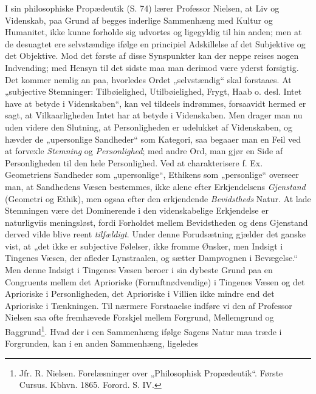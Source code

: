 \documentclass[12pt,a4paper]{book}
\newcommand{\opage}[1]{\marginnote{\footnotesize\textit{[#1]}}}
\begin{document}
I sin philosophiske Propædeutik (S. 74) lærer
Professor Nielsen, at Liv og Videnskab, paa Grund af
begges inderlige Sammenhæng med Kultur og Humanitet,
ikke kunne forholde sig udvortes og ligegyldig til hin%
\opage{21}\setcounter{footnote}{0}anden; men at de desuagtet ere selvstændige ifølge en
principiel Adskillelse af det Subjektive og det Objektive.
Mod det første af disse Synspunkter kan der neppe
reises nogen Indvending; med Hensyn til det sidste maa
man derimod være yderst forsigtig. Det kommer nemlig
an paa, hvorledes Ordet „selvstændig“ skal forstaaes.
At „subjective Stemninger: Tilbøielighed, Utilbøielighed,
Frygt, Haab o. desl. Intet have at betyde i Videnskaben“,
kan vel tildeels indrømmes, forsaavidt hermed
er sagt, at Vilkaarligheden Intet har at betyde i Videnskaben.
Men drager man nu uden videre den Slutning,
at Personligheden er udelukket af Videnskaben, og hævder
de „upersonlige Sandheder“ som Kategori, saa begaaer
man en Feil ved at forvexle \emph{Stemning} og \emph{Personlighed};
med andre Ord, man gjør en Side af Personligheden
til den hele Personlighed. Ved at charakterisere
f. Ex. Geometriens Sandheder som „upersonlige“, Ethikens
som „personlige“ overseer man, at Sandhedens
Væsen bestemmes, ikke alene efter Erkjendelsens \emph{Gjenstand}
(Geometri og Ethik), men ogsaa efter den erkjendende
\emph{Bevidstheds} Natur. At lade Stemningen være
det Dominerende i den videnskabelige Erkjendelse er naturligviis
meningsløst, fordi Forholdet mellem Bevidstheden
og dens Gjenstand derved vilde blive reent \emph{tilfældigt}.
Under denne Forudsætning gjælder det ganske vist, at „det
ikke er subjective Følelser, ikke fromme Ønsker, men
Indsigt i Tingenes Væsen, der afleder Lynstraalen, og
sætter Dampvognen i Bevægelse.“ Men denne Indsigt i
Tingenes Væsen beroer i sin dybeste Grund paa en
Congruents mellem det Aprioriske (Fornuftnødvendige) i
\opage{22}\setcounter{footnote}{0}%
Tingenes Væsen og det Aprioriske i Personligheden, det
Aprioriske i Villien ikke mindre end det Aprioriske i
Tænkningen. Til nærmere Forstaaelse indføre vi den af
Professor Nielsen saa ofte fremhævede Forskjel mellem
Forgrund, Mellemgrund og Baggrund\footnote{Jfr. R. Nielsen. Forelæsninger over „Philosophisk Propædeutik“.
Første Cursus. Kbhvn. 1865. Forord. S. IV.}. Hvad der i
een Sammenhæng ifølge Sagens Natur maa træde i
Forgrunden, kan i en anden Sammenhæng, ligeledes
\end{document}
